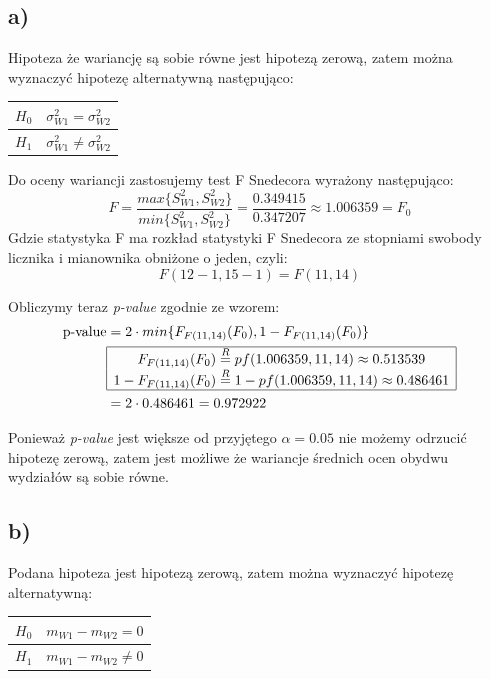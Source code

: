 \documentclass{article}
\begin{document}
\subsection{a)}
Hipoteza że wariancję są sobie równe jest hipotezą zerową, zatem można wyznaczyć hipotezę alternatywną następująco:
\begin{center} \begin{tabular}{|c|c|} \hline
$H_0$ & $\sigma^2_{W1} = \sigma^2_{W2}$ \\ \hline
$H_1$ & $\sigma^2_{W1} \neq \sigma^2_{W2}$ \\ \hline
\end{tabular} \end{center}

Do oceny wariancji zastosujemy test F Snedecora wyrażony następująco:
\[ F = \frac{max\{S_{W1}^2, S_{W2}^2\}}{min\{S_{W1}^2, S_{W2}^2\}} = \frac{0.349415}{0.347207} \approx 1.006359 = F_0 \]
Gdzie statystyka F ma rozkład statystyki F Snedecora ze stopniami swobody licznika i mianownika obniżone o jeden, czyli:
\[ F(12-1, 15-1) = F(11,14) \]

Obliczymy teraz \textit{p-value} zgodnie ze wzorem:
\begin{align*}
\text{p-value} & = 2 \cdot min\{ F_{F(11,14)}(F_0), 1 - F_{F(11,14)}(F_0) \} \\
& \begin{array}{|c|}
\hline
F_{F(11,14)}(F_0)  \overset{R}{=} pf(1.006359, 11, 14) \approx 0.513539 \\
1 - F_{F(11,14)}(F_0) \overset{R}{=} 1 - pf(1.006359, 11, 14) \approx 0.486461 \\ \hline
\end{array} \\
& = 2 \cdot 0.486461 = 0.972922
\end{align*}

Ponieważ \textit{p-value} jest większe od przyjętego $\alpha = 0.05$ nie możemy odrzucić hipotezę zerową, zatem jest możliwe że wariancje średnich ocen obydwu wydziałów są sobie równe.

\subsection{b)}
Podana hipoteza jest hipotezą zerową, zatem można wyznaczyć hipotezę alternatywną:
\begin{center} \begin{tabular}{|c|c|} \hline
$H_0$ & $m_{W1} - m_{W2} = 0$ \\ \hline
$H_1$ & $m_{W1} - m_{W2} \neq 0$ \\ \hline
\end{tabular} \end{center}
\end{document}
